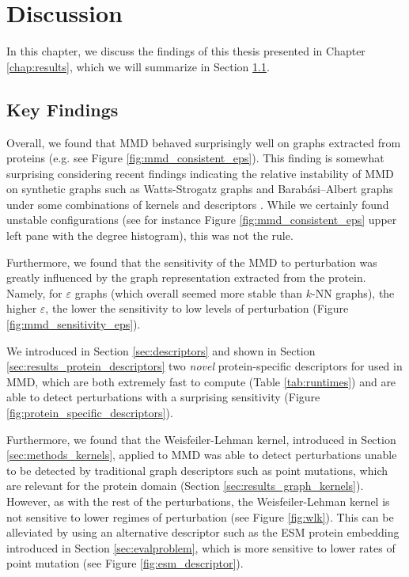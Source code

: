 \chapter{Discussion}\label{chap:discussion}

In this chapter, we discuss the findings of this thesis presented in Chapter
\ref{chap:results}, which we will summarize in Section \ref{sec:key_findings}.

\section{Key Findings}\label{sec:key_findings}

Overall, we found that MMD behaved surprisingly well on graphs extracted from
proteins (e.g. see Figure \ref{fig:mmd_consistent_eps}). This finding is
somewhat surprising considering recent findings indicating the relative
instability of MMD on synthetic graphs such as Watts-Strogatz graphs and
Barabási–Albert graphs under some combinations of kernels and descriptors
\citep{o2021evaluation}. While we certainly found unstable configurations
(see for instance Figure \ref{fig:mmd_consistent_eps} upper left pane with the degree histogram),
this was not the rule.

Furthermore, we found that the sensitivity of the MMD to perturbation was
greatly influenced by the graph representation extracted from the protein.
Namely, for $\varepsilon$ graphs (which overall seemed more stable than $k$-NN
graphs), the higher $\varepsilon$, the lower the sensitivity to low levels of
perturbation (Figure \ref{fig:mmd_sensitivity_eps}).

We introduced in Section \ref{sec:descriptors} and shown in Section
\ref{sec:results_protein_descriptors} two \emph{novel} protein-specific descriptors for
used in MMD, which are both extremely fast to compute (Table \ref{tab:runtimes})
and are able to detect perturbations with a surprising sensitivity (Figure
\ref{fig:protein_specific_descriptors}).

Furthermore, we found that the Weisfeiler-Lehman kernel, introduced in Section
\ref{sec:methods_kernels}, applied to MMD was able to detect perturbations
unable to be detected by traditional graph descriptors such as point mutations,
which are relevant for the protein domain (Section
\ref{sec:results_graph_kernels}). However, as with the rest of the perturbations,
the Weisfeiler-Lehman kernel is not sensitive to lower regimes of perturbation
(see Figure \ref{fig:wlk}).
This can be alleviated by using an alternative descriptor such as the ESM
protein embedding introduced in Section \ref{sec:evalproblem}, which is more
sensitive to lower rates of point mutation (see Figure
\ref{fig:esm_descriptor}).


